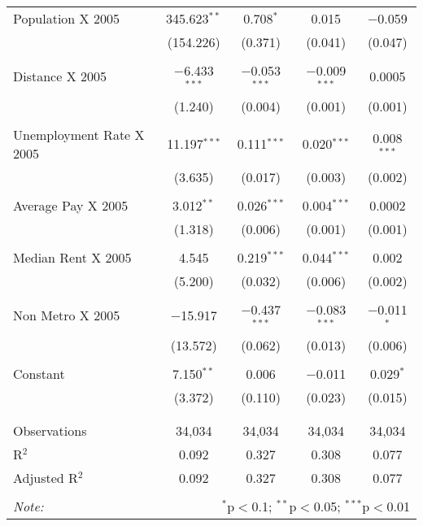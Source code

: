 \documentclass[]{article}
\begin{document}
\begin{table}[!htbp]
\begin{tabular}{@{\extracolsep{5pt}}lcccc}
 Population X 2005 & 345.623$^{**}$ & 0.708$^{*}$ & 0.015 & $-$0.059 \\ 
  & (154.226) & (0.371) & (0.041) & (0.047) \\ 
  & & & & \\ 
 Distance X 2005 & $-$6.433$^{***}$ & $-$0.053$^{***}$ & $-$0.009$^{***}$ & 0.0005 \\ 
  & (1.240) & (0.004) & (0.001) & (0.001) \\ 
  & & & & \\ 
 Unemployment Rate X 2005  & 11.197$^{***}$ & 0.111$^{***}$ & 0.020$^{***}$ & 0.008$^{***}$ \\ 
  & (3.635) & (0.017) & (0.003) & (0.002) \\ 
  & & & & \\ 
 Average Pay X 2005 & 3.012$^{**}$ & 0.026$^{***}$ & 0.004$^{***}$ & 0.0002 \\ 
  & (1.318) & (0.006) & (0.001) & (0.001) \\ 
  & & & & \\ 
 Median Rent X 2005 & 4.545 & 0.219$^{***}$ & 0.044$^{***}$ & 0.002 \\ 
  & (5.200) & (0.032) & (0.006) & (0.002) \\ 
  & & & & \\ 
 Non Metro X 2005 & $-$15.917 & $-$0.437$^{***}$ & $-$0.083$^{***}$ & $-$0.011$^{*}$ \\ 
  & (13.572) & (0.062) & (0.013) & (0.006) \\ 
  & & & & \\ 
 Constant & 7.150$^{**}$ & 0.006 & $-$0.011 & 0.029$^{*}$ \\ 
  & (3.372) & (0.110) & (0.023) & (0.015) \\ 
  & & & & \\ 
\hline \\[-1.8ex] 
Observations & 34,034 & 34,034 & 34,034 & 34,034 \\ 
R$^{2}$ & 0.092 & 0.327 & 0.308 & 0.077 \\ 
Adjusted R$^{2}$ & 0.092 & 0.327 & 0.308 & 0.077 \\ 
\hline 
\hline \\[-1.8ex] 
\textit{Note:}  & \multicolumn{4}{r}{$^{*}$p$<$0.1; $^{**}$p$<$0.05; $^{***}$p$<$0.01} \\ 
\end{tabular} 
\end{table}
\end{document}
